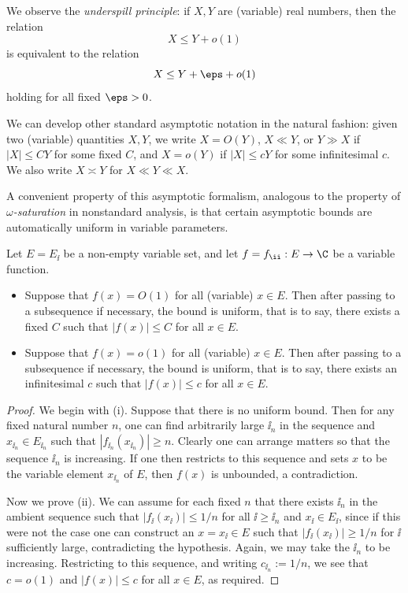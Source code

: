 We observe the \emph{underspill principle}: if $X,Y$ are (variable) real numbers, then the relation
$$ X \leq Y + o(1)$$
is equivalent to the relation
$$ X \leq Y + \eps + o(1)$$
holding for all fixed $\eps>0$.

We can develop other standard asymptotic notation in the natural fashion: given two (variable) quantities $X,Y$, we write $X = O(Y)$, $X \ll Y$, or $Y \gg X$ if $|X| \leq CY$ for some fixed $C$, and $X = o(Y)$ if $|X| \leq cY$ for some infinitesimal $c$.  We also write $X \asymp Y$ for $X \ll Y \ll X$.

A convenient property of this asymptotic formalism, analogous to the property of \emph{$\omega$-saturation} in nonstandard analysis, is that certain asymptotic bounds are automatically uniform in variable parameters.

\begin{proposition}\label{auto}
\leanok
Let $E = E_{\ii}$ be a non-empty variable set, and let $f = f_{\ii}: E \to \C$ be a variable function.  \begin{itemize}
    \item[(i)] Suppose that $f(x)=O(1)$ for all (variable) $x \in E$.  Then after passing to a subsequence if necessary, the bound is uniform, that is to say, there exists a fixed $C$ such that $|f(x)| \leq C$ for all $x \in E$.
    \item[(ii)] Suppose that $f(x)=o(1)$ for all (variable) $x \in E$.  Then after passing to a subsequence if necessary, the bound is uniform, that is to say, there exists an infinitesimal $c$ such that $|f(x)| \leq c$ for all $x \in E$.
\end{itemize}
\end{proposition}

\begin{proof}\leanok We begin with (i).  Suppose that there is no uniform bound.  Then for any fixed natural number $n$, one can find arbitrarily large $\ii_n$ in the sequence and $x_{\ii_n} \in E_{\ii_n}$ such that $|f_{\ii_n}(x_{\ii_n})| \geq n$.  Clearly one can arrange matters so that the sequence $\ii_n$ is increasing.  If one then restricts to this sequence and sets $x$ to be the variable element $x_{\ii_n}$ of $E$, then $f(x)$ is unbounded, a contradiction.

Now we prove (ii).  We can assume for each fixed $n$ that there exists $\ii_n$ in the ambient sequence such that $|f_{\ii}(x_{\ii})| \leq 1/n$ for all $\ii \geq \ii_n$ and $x_{\ii} \in E_{\ii}$, since if this were not the case one can construct an $x = x_{\ii} \in E$ such that $|f_{\ii}(x_{\ii})| \geq 1/n$ for $\ii$ sufficiently large, contradicting the hypothesis.  Again, we may take the $\ii_n$ to be increasing.  Restricting to this sequence, and writing $c_{\ii_n} := 1/n$, we see that $c=o(1)$ and $|f(x)| \leq c$ for all $x \in E$, as required.
\end{proof}

